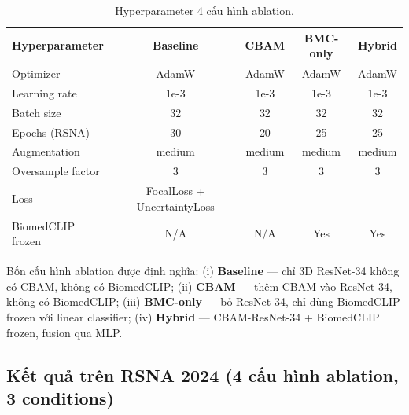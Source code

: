 \begin{table}[H]
\centering
\caption{Hyperparameter 4 cấu hình ablation.}
\label{tab:phase2_hyperparams}
\renewcommand{\arraystretch}{1.2}
\setlength{\tabcolsep}{4pt}
\begin{tabular}{lcccc}
\toprule
\textbf{Hyperparameter} & \textbf{Baseline} & \textbf{CBAM} & \textbf{BMC-only} & \textbf{Hybrid} \\
\midrule
Optimizer & AdamW & AdamW & AdamW & AdamW \\
Learning rate & 1e-3 & 1e-3 & 1e-3 & 1e-3 \\
Batch size & 32 & 32 & 32 & 32 \\
Epochs (RSNA) & 30 & 20 & 25 & 25 \\
Augmentation & medium & medium & medium & medium \\
Oversample factor & 3 & 3 & 3 & 3 \\
Loss & FocalLoss + UncertaintyLoss & --- & --- & --- \\
BiomedCLIP frozen & N/A & N/A & Yes & Yes \\
\bottomrule
\end{tabular}
\end{table}

Bốn cấu hình ablation được định nghĩa: (i) \textbf{Baseline} --- chỉ 3D ResNet-34 không có CBAM, không có BiomedCLIP; (ii) \textbf{CBAM} --- thêm CBAM vào ResNet-34, không có BiomedCLIP; (iii) \textbf{BMC-only} --- bỏ ResNet-34, chỉ dùng BiomedCLIP frozen với linear classifier; (iv) \textbf{Hybrid} --- CBAM-ResNet-34 + BiomedCLIP frozen, fusion qua MLP.

\subsection{Kết quả trên RSNA 2024 (4 cấu hình ablation, 3 conditions)}
\label{subsec:rsna_ablation}

